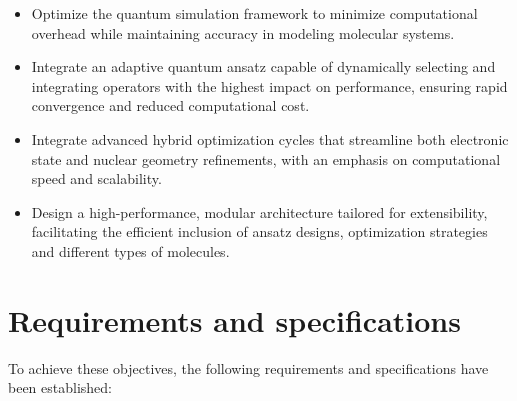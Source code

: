 \begin{itemize}
  \item Optimize the quantum simulation framework to minimize computational overhead while maintaining accuracy in modeling molecular systems.
  \item Integrate an adaptive quantum ansatz capable of dynamically selecting and integrating operators with the highest impact on performance, ensuring rapid convergence and reduced computational cost.
  \item Integrate advanced hybrid optimization cycles that streamline both electronic state and nuclear geometry refinements, with an emphasis on computational speed and scalability.
  \item Design a high-performance, modular architecture tailored for extensibility, facilitating the efficient inclusion of ansatz designs, optimization strategies and different types of molecules.
\end{itemize}


\section{Requirements and specifications}

To achieve these objectives, the following requirements and specifications have been established:

